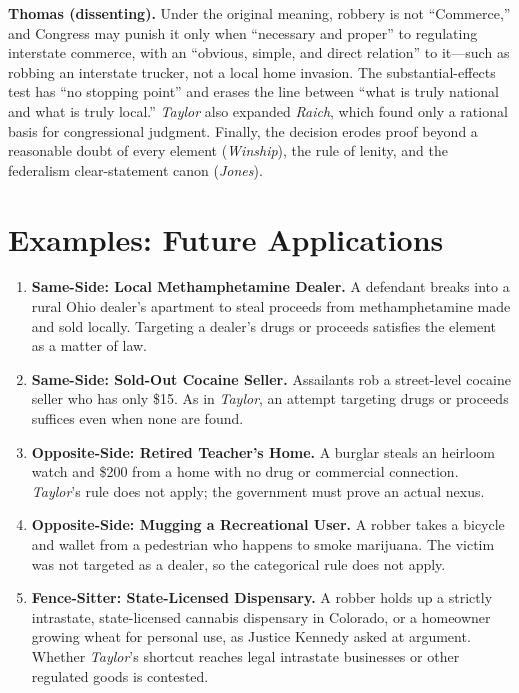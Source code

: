 \documentclass[12pt]{article}
\begin{document}
\textbf{Thomas (dissenting).} Under the original meaning, robbery is not ``Commerce,'' and Congress may punish it only when ``necessary and proper'' to regulating interstate commerce, with an ``obvious, simple, and direct relation'' to it---such as robbing an interstate trucker, not a local home invasion. The substantial-effects test has ``no stopping point'' and erases the line between ``what is truly national and what is truly local.'' \textit{Taylor} also expanded \textit{Raich}, which found only a rational basis for congressional judgment. Finally, the decision erodes proof beyond a reasonable doubt of every element (\textit{Winship}), the rule of lenity, and the federalism clear-statement canon (\textit{Jones}).

\section{Examples: Future Applications}

\begin{enumerate}
\item \textbf{Same-Side: Local Methamphetamine Dealer.} A defendant breaks into a rural Ohio dealer's apartment to steal proceeds from methamphetamine made and sold locally. Targeting a dealer's drugs or proceeds satisfies the element as a matter of law.
\item \textbf{Same-Side: Sold-Out Cocaine Seller.} Assailants rob a street-level cocaine seller who has only \$15. As in \textit{Taylor}, an attempt targeting drugs or proceeds suffices even when none are found.
\item \textbf{Opposite-Side: Retired Teacher's Home.} A burglar steals an heirloom watch and \$200 from a home with no drug or commercial connection. \textit{Taylor}'s rule does not apply; the government must prove an actual nexus.
\item \textbf{Opposite-Side: Mugging a Recreational User.} A robber takes a bicycle and wallet from a pedestrian who happens to smoke marijuana. The victim was not targeted as a dealer, so the categorical rule does not apply.
\item \textbf{Fence-Sitter: State-Licensed Dispensary.} A robber holds up a strictly intrastate, state-licensed cannabis dispensary in Colorado, or a homeowner growing wheat for personal use, as Justice Kennedy asked at argument. Whether \textit{Taylor}'s shortcut reaches legal intrastate businesses or other regulated goods is contested.
\end{enumerate}
\end{document}
